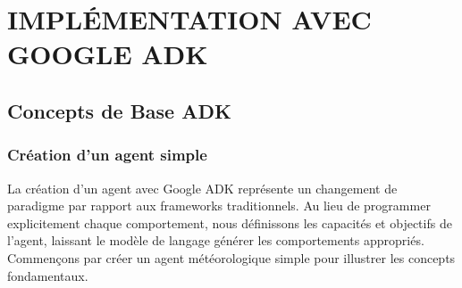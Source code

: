 \chapter*{IMPLÉMENTATION AVEC GOOGLE ADK}

\section{Concepts de Base ADK}

\subsection{Création d'un agent simple}

La création d'un agent avec Google ADK représente un changement de paradigme par rapport aux frameworks traditionnels. Au lieu de programmer explicitement chaque comportement, nous définissons les capacités et objectifs de l'agent, laissant le modèle de langage générer les comportements appropriés. Commençons par créer un agent météorologique simple pour illustrer les concepts fondamentaux.

